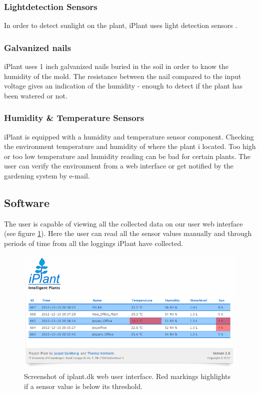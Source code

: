 \documentclass{ubicomp2012}
\begin{document}
\subsubsection{Lightdetection Sensors}
In order to detect sunlight on the plant, iPlant uses light detection sensors \cite{light-sensors}. 

\subsubsection{Galvanized nails}
iPlant uses 1 inch galvanized nails buried in the soil in order to know the humidity of the mold. The resistance between the nail compared to the input voltage gives an indication of the humidity - enough to detect if the plant has been watered or not.

\subsubsection{Humidity \& Temperature Sensors}
iPlant is equipped with a humidity and temperature sensor component. Checking the environment temperature and humidity of where the plant i located. Too high or too low temperature and humidity reading can be bad for certain plants. The user can verify the environment from a web interface or get notified by the gardening system by e-mail.

\subsection{Software}
The user is capable of viewing all the collected data on our user web interface (see figure \ref{fig:web_overview}). Here the user can read all the sensor values manually and through periods of time from all the loggings iPlant have collected.

\begin{figure}[h!]
\centering
\includegraphics[width=\columnwidth]{web_overview.png}
\caption{Screenshot of iplant.dk web user interface. Red markings highlights if a sensor value is below its threshold.}
\label{fig:web_overview}
\end{figure}
\end{document}
